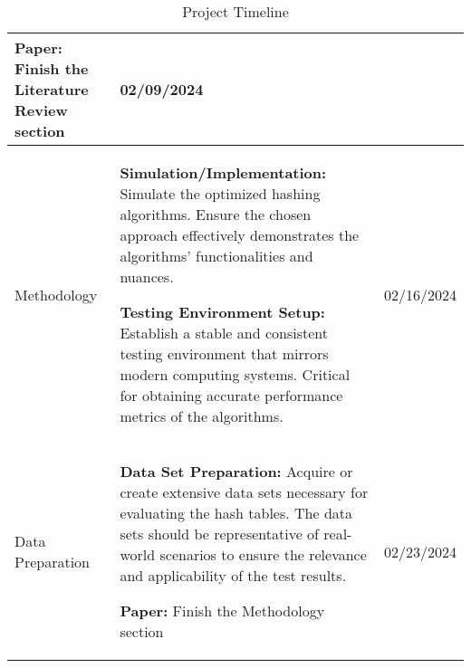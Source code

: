 \documentclass[11pt]{article}
\begin{document}
\begin{table}[h!]
\begin{tabular}{ | m{3cm} | m{10cm}| m{2cm} | }
            \textbf{Paper:} Finish the Literature Review section
        & 02/09/2024 \\

        \hline
        Methodology & 
        \textbf{Simulation/Implementation:} Simulate the optimized hashing algorithms. Ensure the chosen approach effectively demonstrates the algorithms' functionalities and nuances.

        \textbf{Testing Environment Setup:} Establish a stable and consistent testing environment that mirrors modern computing systems. Critical for obtaining accurate performance metrics of the algorithms.
        & 02/16/2024 \\
        \hline
        
        \hline
        Data Preparation & 
            \textbf{Data Set Preparation:} Acquire or create extensive data sets necessary for evaluating the hash tables. The data sets should be representative of real-world scenarios to ensure the relevance and applicability of the test results.
            
            \textbf{Paper:} Finish the Methodology section 
        & 02/23/2024 \\
        \hline

\end{tabular}
\caption{Project Timeline}
\label{tab:timeline}
\end{table}
\end{document}

